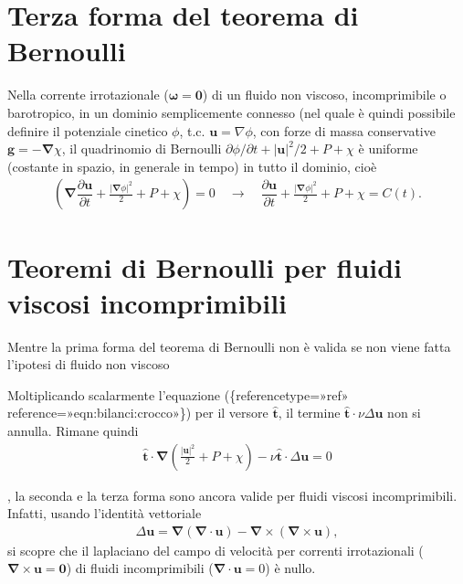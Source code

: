 \documentclass[letterpaper,10pt,italian]{jupyterBook}
\begin{document}
\section{Terza forma del teorema di Bernoulli}
\label{\detokenize{polimi/fluidmechanics-ita/template/capitoli/05_bernoulli/05teoria:terza-forma-del-teorema-di-bernoulli}}
\sphinxAtStartPar
Nella corrente irrotazionale (\(\mathbf{\omega} = \mathbf{0}\)) di un fluido non
viscoso, incomprimibile o barotropico, in un dominio semplicemente
connesso (nel quale è quindi possibile definire il potenziale cinetico
\(\phi\), t.c. \(\mathbf{u} = \nabla \phi\), con forze di massa conservative
\(\mathbf{g} = -\mathbf{\nabla} \chi\), il quadrinomio di Bernoulli
\(\partial \phi / \partial t + |\mathbf{u}|^2/2 + P + \chi\) è uniforme
(costante in spazio, in generale  in tempo) in tutto il dominio,
cioè
\begin{equation*}
\begin{split} \left(\mathbf{\nabla}\dfrac{\partial \mathbf{u}}{\partial t}  + \frac{|\mathbf{\nabla} \phi|^2}{2} + P + \chi \right) = 0  \quad \rightarrow \quad 
 \dfrac{\partial \mathbf{u}}{\partial t}  + \frac{|\mathbf{\nabla} \phi|^2}{2} + P + \chi = C(t).\end{split}
\end{equation*}

\section{Teoremi di Bernoulli per fluidi viscosi incomprimibili}
\label{\detokenize{polimi/fluidmechanics-ita/template/capitoli/05_bernoulli/05teoria:teoremi-di-bernoulli-per-fluidi-viscosi-incomprimibili}}
\sphinxAtStartPar
Mentre la prima forma del teorema di Bernoulli non è valida se non viene
fatta l’ipotesi di fluido non viscoso%
\begin{footnote}[1]\sphinxAtStartFootnote
Moltiplicando scalarmente l’equazione
(\{reference\sphinxhyphen{}type=»ref»
reference=»eqn:bilanci:crocco»\}) per il versore \(\mathbf{\hat{t}}\), il
termine \(\mathbf{\hat{t}}\cdot \nu \Delta \mathbf{u}\) non si annulla. Rimane
quindi
\begin{equation*}
\begin{split}\mathbf{\hat{t}} \cdot \mathbf{\nabla} \left( \frac{|\mathbf{u}|^2}{2} + P + \chi \right) - \nu \mathbf{\hat{t}} \cdot \Delta \mathbf{u} = 0\end{split}
\end{equation*}%
\end{footnote}, la seconda e la terza forma
sono ancora valide per fluidi viscosi incomprimibili. Infatti, usando
l’identità vettoriale
\begin{equation*}
\begin{split}\Delta \mathbf{u} = \mathbf{\nabla} (\mathbf{\nabla}\cdot \mathbf{u})
  - \mathbf{\nabla} \times (\mathbf{\nabla} \times \mathbf{u}) ,\end{split}
\end{equation*}
\sphinxAtStartPar
si scopre che il
laplaciano del campo di velocità per correnti irrotazionali
(\(\mathbf{\nabla} \times \mathbf{u} = \mathbf{0}\)) di fluidi incomprimibili
(\(\mathbf{\nabla} \cdot \mathbf{u} = 0\)) è nullo.
\end{document}
